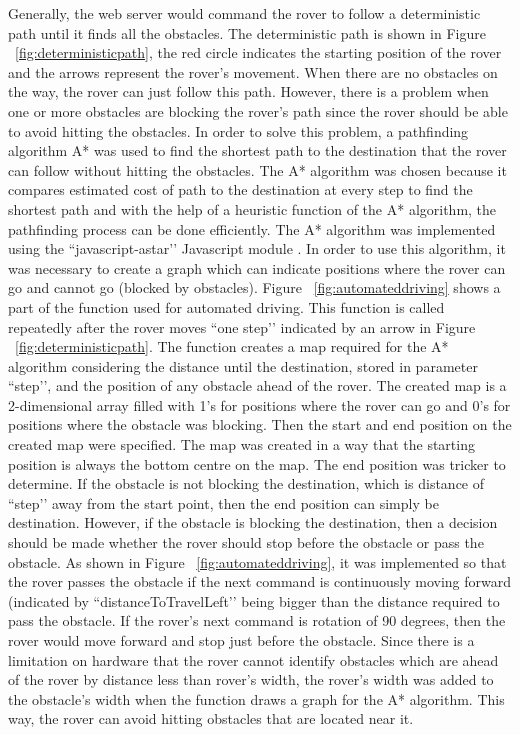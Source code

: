 \documentclass[a4paper]{article}
\begin{document}
Generally, the web server would command the rover to follow a deterministic path until it finds all the obstacles. The deterministic 
path is shown in Figure ~\ref{fig:deterministicpath}, the red circle indicates the starting position of the rover and the arrows represent the rover’s movement. 
When there are no obstacles on the way, the rover can just follow this path. However, there is a problem when one or more obstacles 
are blocking the rover’s path since the rover should be able to avoid hitting the obstacles. In order to solve this problem, a pathfinding 
algorithm A* \cite{astarAlgorithm} was used to find the shortest path to the destination that the rover can follow without hitting the 
obstacles. The A* algorithm was chosen because it compares estimated cost of path to the destination at every step to find the shortest 
path and with the help of a heuristic function of the A* algorithm, the pathfinding process can be done efficiently. \cite{astarAlgorithm}
The A* algorithm was implemented using the ``javascript-astar’’ Javascript module \cite{astarModule}. In order to use this algorithm, it 
was necessary to create a graph which can indicate positions where the rover can go and cannot go (blocked by obstacles). Figure ~\ref{fig:automateddriving} shows 
a part of the function used for automated driving. This function is called repeatedly after the rover moves ``one step’’ indicated by an 
arrow in Figure ~\ref{fig:deterministicpath}. The function creates a map required for the A* algorithm considering the distance until the destination, stored in 
parameter ``step’’, and the position of any obstacle ahead of the rover. The created map is a 2-dimensional array filled with 1’s for 
positions where the rover can go and 0’s for positions where the obstacle was blocking. Then the start and end position on the created 
map were specified. The map was created in a way that the starting position is always the bottom centre on the map. The end position was 
tricker to determine. If the obstacle is not blocking the destination, which is distance of ``step’’ away from the start point, then the 
end position can simply be destination. However, if the obstacle is blocking the destination, then a decision should be made whether the 
rover should stop before the obstacle or pass the obstacle. As shown in Figure ~\ref{fig:automateddriving}, it was implemented so that the rover passes the obstacle 
if the next command is continuously moving forward (indicated by ``distanceToTravelLeft’’ being bigger than the distance required to pass 
the obstacle. If the rover’s next command is rotation of 90 degrees, then the rover would move forward and stop just before the obstacle. 
Since there is a limitation on hardware that the rover cannot identify obstacles which are ahead of the rover by distance less than rover’s 
width, the rover’s width was added to the obstacle’s width when the function draws a graph for the A* algorithm. This way, the rover can 
avoid hitting obstacles that are located near it. 
\end{document}
